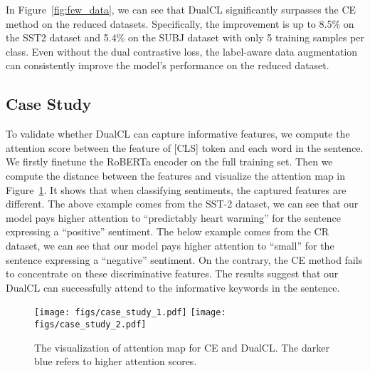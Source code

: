 In Figure~\ref{fig:few_data}, we can see that DualCL significantly surpasses the CE method on the reduced datasets. Specifically, the improvement is up to 8.5\% on the SST2 dataset and 5.4\% on the SUBJ dataset with only 5 training samples per class. Even without the dual contrastive loss, the label-aware data augmentation can consistently improve the model's performance on the reduced dataset.

\subsection{Case Study}

To validate whether DualCL can capture informative features, we compute the attention score between the feature of [CLS] token and each word in the sentence. We firstly finetune the RoBERTa encoder on the full training set. Then we compute the  distance between the features and visualize the attention map in Figure~\ref{fig:case_study}. It shows that when classifying sentiments, the captured features are different. The above example comes from the SST-2 dataset, we can see that our model pays higher attention to  ``predictably heart warming'' for the sentence expressing a ``positive'' sentiment. The below example comes from the CR dataset, we can see that our model pays higher attention to ``small'' for the sentence expressing a ``negative'' sentiment. On the contrary, the CE method fails to concentrate on these discriminative features. The results suggest that our DualCL can successfully attend to the informative keywords in the sentence.

\begin{figure}[t]
    \centering
    \texttt{[image: figs/case\_study\_1.pdf]}
    \texttt{[image: figs/case\_study\_2.pdf]}
    \caption{The visualization of attention map for CE and DualCL. The darker blue refers to higher attention scores.}
    \label{fig:case_study}
\end{figure}
